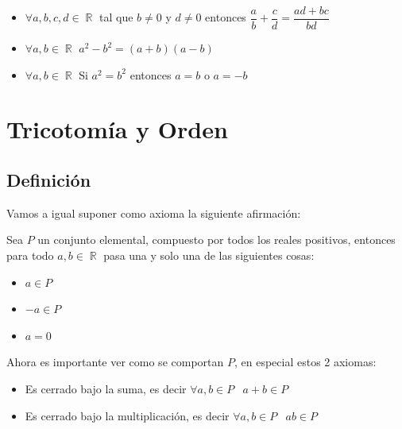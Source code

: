 \documentclass[12pt, fleqn]{report}                             %
\newenvironment{SmallIndentation}[1][0.75em]                    %
        {\begin{adjustwidth}{#1}{}\begin{footnotesize}}             %
        {\end{footnotesize}\end{adjustwidth}}                       %
\DeclareMathOperator \Space     {\quad}                         %
\DeclareMathOperator \MiniSpace {\;}                            %
\theoremstyle{break}                                            %
\DeclareMathOperator \Reals        {\mathbb{R}}                 %
\begin{document}
\begin{itemize}
\begin{SmallIndentation}[1em]
                        
                        \end{SmallIndentation}
                    
                    \item $\forall a, b, c, d \in \Reals$ tal que $b \neq 0$ y $d \neq 0$ entonces
                        $\dfrac{a}{b} + \dfrac{c}{d} = \dfrac{ad+bc}{bd}$        

                    \item $\forall a, b \in \Reals$ $a^2-b^2 = (a+b)(a-b)$

                    \item $\forall a, b \in \Reals$ Si $a^2 = b^2$ entonces $a=b$ o $a=-b$

                \end{itemize}




        \clearpage
        \section{Tricotomía y Orden}

            \subsection{Definición}

                Vamos a igual suponer como axioma la siguiente afirmación:

                Sea $P$ un conjunto elemental, compuesto por todos los reales positivos, entonces 
                para todo $a, b \in \Reals$ pasa una y solo una de las siguientes cosas:

                \begin{itemize}
                    \item $a \in P$
                    \item $-a \in P$
                    \item $a = 0$
                \end{itemize}

                Ahora es importante ver como se comportan $P$, en especial estos 2 axiomas:
                \begin{itemize}
                    \item Es cerrado bajo la suma, es decir $\forall a, b \in P \MiniSpace a + b \in P$
                    \item Es cerrado bajo la multiplicación, es decir $\forall a, b \in P \MiniSpace ab \in P$
                \end{itemize}
\end{document}
